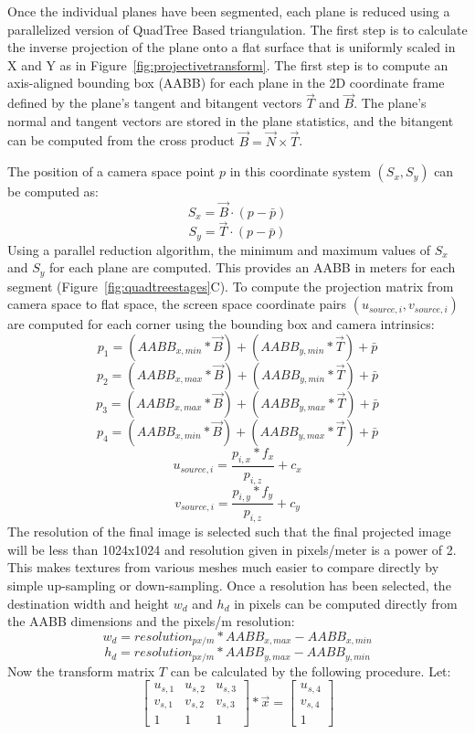 Once the individual planes have been segmented, each plane is reduced using a parallelized version of QuadTree Based triangulation\cite{planesegmentationQTB}. The first step is to calculate the inverse projection of the plane onto a flat surface that is uniformly scaled in X and Y as in Figure~\ref{fig:projectivetransform}.
The first step is to compute an axis-aligned bounding box (AABB) for each plane in the 2D coordinate frame defined by the plane's tangent and bitangent vectors $\vec{T}$ and $\vec{B}$. The plane's normal and tangent vectors are stored in the plane statistics, and the bitangent can be computed from the cross product $\vec{B}=\vec{N} \times \vec{T}$.\par
The position of a camera space point $p$ in this coordinate system $(S_x,S_y)$ can be computed as: $$S_x=\vec{B} \cdot (p - \bar{p})$$ $$S_y=\vec{T} \cdot (p - \bar{p})$$
Using a parallel reduction algorithm, the minimum and maximum values of $S_x$ and $S_y$ for each plane are computed. This provides an AABB in meters for each segment (Figure~\ref{fig:quadtreestages}C). To compute the projection matrix from camera space to flat space, the screen space coordinate pairs $(u_{source,i},v_{source,i})$ are computed for each corner using the bounding box and camera intrinsics: 
$$p_1 = (AABB_{x,min} * \vec{B})+(AABB_{y,min} * \vec{T})+\bar{p}$$
$$p_2 = (AABB_{x,max} * \vec{B})+(AABB_{y,min} * \vec{T})+\bar{p}$$
$$p_3 = (AABB_{x,max} * \vec{B})+(AABB_{y,max} * \vec{T})+\bar{p}$$
$$p_4 = (AABB_{x,min} * \vec{B})+(AABB_{y,max} * \vec{T})+\bar{p}$$
$$u_{source,i} = \frac{p_{i,x}*f_x}{p_{i,z}} + c_x$$
$$v_{source,i} = \frac{p_{i,y}*f_y}{p_{i,z}} + c_y$$
The resolution of the final image is selected such that the final projected image will be less than 1024x1024 and resolution given in pixels/meter is a power of 2. This makes textures from various meshes much easier to compare directly by simple up-sampling or down-sampling. Once a resolution has been selected, the destination width and height $w_d$ and $h_d$ in pixels can be computed directly from the AABB dimensions and the pixels/m resolution: 
$$w_d=resolution_{px/m} * {AABB_{x,max}-AABB_{x,min}}$$
$$h_d=resolution_{px/m} * {AABB_{y,max}-AABB_{y,min}}$$
Now the transform matrix $T$ can be calculated by the following procedure. Let:
$$\begin{bmatrix}
  u_{s,1} & u_{s,2} & u_{s,3} \\
  v_{s,1} & v_{s,2} & v_{s,3} \\
  1 & 1 & 1 
 \end{bmatrix} * \vec{x} = \begin{bmatrix}
  u_{s,4} \\
  v_{s,4} \\
  1
 \end{bmatrix}$$
